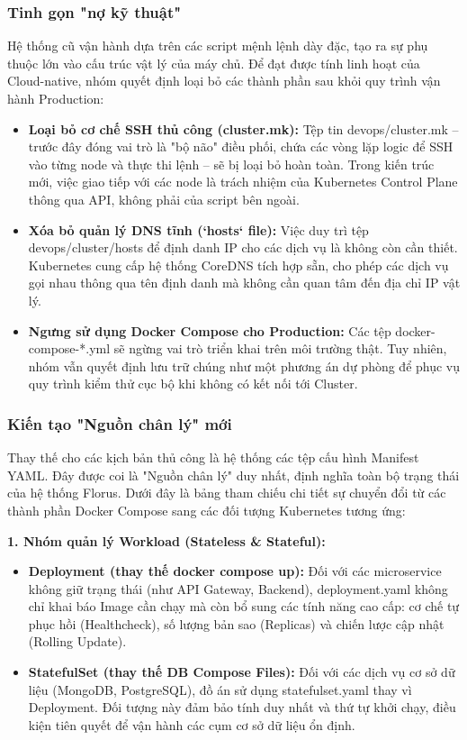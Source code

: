 \subsubsection{Tinh gọn "nợ kỹ thuật"} Hệ thống cũ vận hành dựa trên các script mệnh lệnh dày đặc, tạo ra sự phụ thuộc lớn vào cấu trúc vật lý của máy chủ. Để đạt được tính linh hoạt của Cloud-native, nhóm quyết định loại bỏ các thành phần sau khỏi quy trình vận hành Production:

\begin{itemize} 
    \item \textbf{Loại bỏ cơ chế SSH thủ công (cluster.mk):} Tệp tin devops/cluster.mk – trước đây đóng vai trò là "bộ não" điều phối, chứa các vòng lặp logic để SSH vào từng node và thực thi lệnh – sẽ bị loại bỏ hoàn toàn. Trong kiến trúc mới, việc giao tiếp với các node là trách nhiệm của Kubernetes Control Plane thông qua API, không phải của script bên ngoài.

    \item \textbf{Xóa bỏ quản lý DNS tĩnh (`hosts` file):} Việc duy trì tệp devops/cluster/hosts để định danh IP cho các dịch vụ là không còn cần thiết. Kubernetes cung cấp hệ thống CoreDNS tích hợp sẵn, cho phép các dịch vụ gọi nhau thông qua tên định danh mà không cần quan tâm đến địa chỉ IP vật lý.

    \item \textbf{Ngưng sử dụng Docker Compose cho Production:} Các tệp docker-compose-*.yml sẽ ngừng vai trò triển khai trên môi trường thật. Tuy nhiên, nhóm vẫn quyết định lưu trữ chúng như một phương án dự phòng để phục vụ quy trình kiểm thử cục bộ khi không có kết nối tới Cluster.
    
\end{itemize}

\subsubsection{Kiến tạo "Nguồn chân lý" mới} Thay thế cho các kịch bản thủ công là hệ thống các tệp cấu hình Manifest YAML. Đây được coi là "Nguồn chân lý" duy nhất, định nghĩa toàn bộ trạng thái của hệ thống Florus. Dưới đây là bảng tham chiếu chi tiết sự chuyển đổi từ các thành phần Docker Compose sang các đối tượng Kubernetes tương ứng:

\textbf{1. Nhóm quản lý Workload (Stateless \& Stateful):} 

\begin{itemize} 
    \item \textbf{Deployment (thay thế docker compose up):} Đối với các microservice không giữ trạng thái (như API Gateway, Backend), deployment.yaml không chỉ khai báo Image cần chạy mà còn bổ sung các tính năng cao cấp: cơ chế tự phục hồi (Healthcheck), số lượng bản sao (Replicas) và chiến lược cập nhật (Rolling Update). 
    \item \textbf{StatefulSet (thay thế DB Compose Files):} Đối với các dịch vụ cơ sở dữ liệu (MongoDB, PostgreSQL), đồ án sử dụng statefulset.yaml thay vì Deployment. Đối tượng này đảm bảo tính duy nhất và thứ tự khởi chạy, điều kiện tiên quyết để vận hành các cụm cơ sở dữ liệu ổn định. 
\end{itemize}

